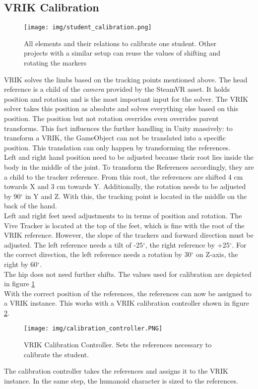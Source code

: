 \subsection{VRIK Calibration}
\begin{figure}
	\centering
	\texttt{[image: img/student\_calibration.png]}
	\caption{All elements and their relations to calibrate one student. Other projects with a similar setup can reuse the values of shifting and rotating the markers}
	\label{fig:student_calibration}
\end{figure}
VRIK solves the limbs based on the tracking points mentioned above. The head reference is a child of the \textit{camera} provided by the SteamVR asset. It holds position and rotation and is the most important input for the solver. The VRIK solver takes this position as absolute and solves everything else based on this position. The position but not rotation overrides even overrides parent transforms. This fact influences the further handling in Unity massively: to transform a VRIK, the GameObject can not be translated into a specific position. This translation can only happen by transforming the references.\\
Left and right hand position need to be adjusted because their root lies inside the body in the middle of the joint. To transform the References accordingly, they are a child to the tracker reference. From this root, the references are shifted 4 cm towards X and 3 cm towards Y. Additionally, the rotation needs to be adjusted by 90$^\circ$ in Y and Z. With this, the tracking point is located in the middle on the back of the hand.\\
Left and right feet need adjustments to in terms of position and rotation. The Vive Tracker is located at the top of the feet, which is fine with the root of the VRIK reference. However, the slope of the trackers and forward direction must be adjusted. The left reference needs a tilt of -25$^\circ$, the right reference by +25$^\circ$. For the correct direction, the left reference needs a rotation by 30$^\circ$ on Z-axis, the right by 60$^\circ$.\\
The hip does not need further shifts. The values used for calibration are depicted in figure \ref{fig:student_calibration}\\
With the correct position of the references, the references can now be assigned to a VRIK instance. This works with a VRIK calibration controller shown in figure \ref{fig:calibrationController}.
\begin{figure}
	\centering
	\texttt{[image: img/calibration\_controller.PNG]}
	\caption{VRIK Calibration Controller. Sets the references necessary to calibrate the student.}
	\label{fig:calibrationController}
\end{figure}
The calibration controller takes the references and assigns it to the VRIK instance. In the same step, the humanoid character is sized to the references.

